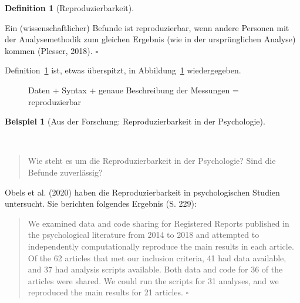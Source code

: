 \documentclass[
  letterpaper,
  twoside,
  open=any]{scrbook}
\theoremstyle{definition}
\theoremstyle{definition}
\newtheorem{example}{Beispiel}[chapter]
\theoremstyle{definition}
\newtheorem{definition}{Definition}[chapter]
\theoremstyle{remark}
\begin{document}
\begin{definition}[Reproduzierbarkeit]\protect\hypertarget{def-repro}{}\label{def-repro}

Ein (wissenschaftlicher) Befunde ist reproduzierbar, wenn andere
Personen mit der Analysemethodik zum gleichen Ergebnis (wie in der
ursprünglichen Analyse) kommen (Plesser, 2018). \(\square\)

\end{definition}

Definition~\ref{def-repro} ist, etwas überspitzt, in
Abbildung~\ref{fig-repro} wiedergegeben.

\begin{figure}


\caption{\label{fig-repro}Daten + Syntax + genaue Beschreibung der
Messungen = reproduzierbar}

\end{figure}%

\begin{example}[Aus der Forschung: Reproduzierbarkeit in der
Psychologie]\protect\hypertarget{exm-repro}{}\label{exm-repro}

~

\begin{quote}
{} Wie steht es um die Reproduzierbarkeit in der
Psychologie? Sind die Befunde zuverlässig?
\end{quote}

Obels et al. (2020) haben die Reproduzierbarkeit in psychologischen
Studien untersucht. Sie berichten folgendes Ergebnis (S. 229):

\begin{quote}
We examined data and code sharing for Registered Reports published in
the psychological literature from 2014 to 2018 and attempted to
independently computationally reproduce the main results in each
article. Of the 62 articles that met our inclusion criteria, 41 had data
available, and 37 had analysis scripts available. Both data and code for
36 of the articles were shared. We could run the scripts for 31
analyses, and we reproduced the main results for 21 articles.
\(\square\)
\end{quote}

\end{example}
\end{document}
